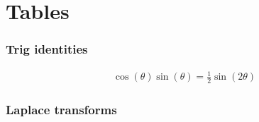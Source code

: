 \part{Tables}
\section{Trig identities}
\begin{align}
    \cos(\theta)\sin(\theta) = \frac{1}{2}\sin(2\theta)
\end{align}

\section{Laplace transforms}